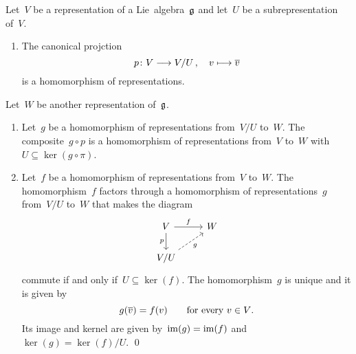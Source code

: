 \begin{proposition}
  \label{homomorphism theorem!for representations}
  Let~$V$ be a representation of a Lie~algebra~$\mathfrak{g}$ and let~$U$ be a subrepresentation of~$V$.
  \begin{enumerate}
    \item
      The canonical projction
      \[
        p
        \colon
        V
        \to
        V/U \,,
        \quad
        v
        \mapsto
        \class{v}
      \]
      is a homomorphism of representations. 
  \end{enumerate}
  Let~$W$ be another representation of~$\mathfrak{g}$.
  \begin{enumerate}[resume*]
    \item
      Let~$g$ be a homomorphism of representations from~$V/U$ to~$W$.
      The composite~$g \circ p$ is a homomorphism of representations from~$V$ to~$W$ with~$U \subseteq \ker(g \circ \pi)$.
    \item
      Let~$f$ be a homomorphism of representations from~$V$ to~$W$.
      The homomorphism~$f$ factors through a homomorphism of representations~$g$ from~$V/U$ to~$W$ that makes the diagram
      \[
        \begin{tikzcd}
          V
          \arrow{r}[above]{f}
          \arrow{d}[left]{p}
          &
          W
          \\
          V/U
          \arrow[dashed]{ur}[below right]{g}
          &
          {}
        \end{tikzcd}
      \]
      commute if and only if~$U \subseteq \ker(f)$.
      The homomorphism~$g$ is unique and it is given by
      \[
        g(\overline{v}) = f(v)
        \qquad
        \text{for every~$v \in V$.}
      \]
      Its image and kernel are given by~$\operatorname{im}(g) = \operatorname{im}(f)$ and~$\ker(g) = \ker(f)/U$.
    \qed
  \end{enumerate}
\end{proposition}


